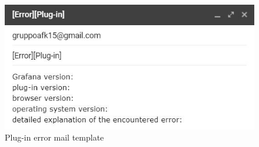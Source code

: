 \begin{figure}[H]
\centering
\includegraphics[scale=0.85]{img/mail/plug-in_mail.jpg}
\caption{Plug-in error mail template}
\end{figure}